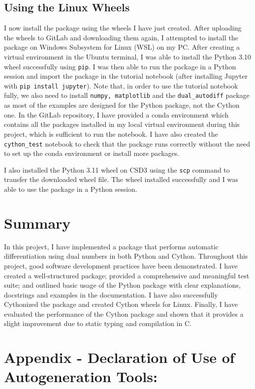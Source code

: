 \documentclass{article}
\begin{document}
 \subsection{ Using the Linux Wheels }

I now install the package using the wheels I have just created. After uploading the wheels to GitLab and downloading them again, I attempted to install the package on Windows Subsystem for Linux (WSL) on my PC. After creating a virtual environment in the Ubuntu terminal, I was able to install the Python 3.10 wheel successfully using \texttt{pip}. I was then able to run the package in a Python session and import the package in the tutorial notebook (after installing Jupyter with \texttt{pip install jupyter}). Note that, in order to use the tutorial notebook fully, we also need to install \texttt{numpy, matplotlib} and the \texttt{dual\_autodiff} package as most of the examples are designed for the Python package, not the Cython one. In the GitLab repository, I have provided a conda environment which contains all the packages installed in my local virtual environment during this project, which is sufficient to run the notebook. I have also created the \texttt{cython\_test} notebook to check that the package runs correctly without the need to set up the conda environment or install more packages. 

I also installed the Python 3.11 wheel on CSD3 using the \texttt{scp} command to transfer the downloaded wheel file. The wheel installed successfully and I was able to use the package in a Python session. 

\section*{Summary}

In this project, I have implemented a package that performs automatic differentiation using dual numbers in both Python and Cython. Throughout this project, good software development practices have been demonstrated. I have created a well-structured package; provided a comprehensive and meaningful test suite; and outlined basic usage of the Python package with clear explanations, docstrings and examples in the documentation. I have also successfully Cythonized the package and created Cython wheels for Linux. Finally, I have evaluated the performance of the Cython package and shown that it provides a slight improvement due to static typing and compilation in C. 

\section*{Appendix - Declaration of Use of Autogeneration Tools:
}
\end{document}
